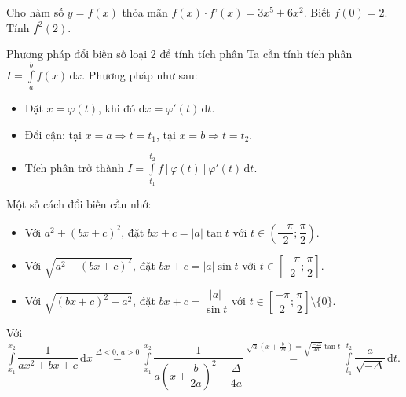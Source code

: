 \begin{ex}%
	Cho hàm số $y=f(x)$ thỏa mãn $f(x)\cdot f’(x)=3x^5+6x^2$. Biết $f(0)=2$. Tính $f^2(2)$.
\end{ex}
\begin{dang}{Phương pháp đổi biến số loại 2 để tính tích phân}
	Ta cần tính tích phân $\displaystyle I=\int\limits_a^b f(x)\mathrm{\,d}x$. Phương pháp như sau:
	\begin{itemize}
		\item Đặt $x=\varphi(t)$, khi đó $\mathrm{d}x=\varphi'(t)\mathrm{\,d}t$.
		\item Đổi cận: tại $x=a\Rightarrow t=t_1$, tại $x=b\Rightarrow t=t_2$.
		\item Tích phân trở thành $\displaystyle I=\int\limits_{t_1}^{t_2}f[\varphi(t)]\varphi'(t)\mathrm{\,d}t$.
	\end{itemize}
	Một số cách đổi biến cần nhớ:
	\begin{itemize}
		\item Với $a^2+(bx+c)^2$, đặt $bx+c=|a|\tan t$ với $t\in\left(\dfrac{-\pi}{2};\dfrac{\pi}{2}\right)$.
		\item Với $\sqrt{a^2-(bx+c)^2}$, đặt $bx+c=|a|\sin t$ với $t\in\left[\dfrac{-\pi}{2};\dfrac{\pi}{2}\right]$.
		\item Với $\sqrt{(bx+c)^2-a^2}$, đặt $bx+c=\dfrac{|a|}{\sin t}$ với $t\in\left[\dfrac{-\pi}{2};\dfrac{\pi}{2}\right]\setminus\{0\}$.
	\end{itemize}
	Với $\displaystyle\int\limits_{x_1}^{x_2}\dfrac{1}{ax^2+bx+c}\mathrm{\,d}x\stackrel{\Delta<0,\,a>0}{=}\int\limits_{x_1}^{x_2}\dfrac{1}{a\left(x+\dfrac{b}{2a}\right)^2-\dfrac{\Delta}{4a}}\stackrel{\sqrt{a}\left(x+\frac{b}{2a}\right)=\sqrt{\frac{-\Delta}{4a}}\tan t}{=}\int\limits_{t_1}^{t_2}\dfrac{a}{\sqrt{-\Delta}}\mathrm{\,d}t$.
\end{dang}
